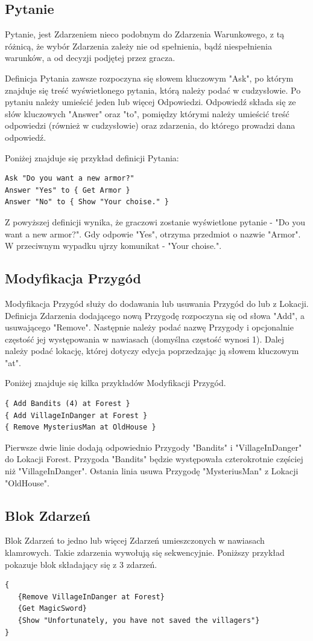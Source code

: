 \documentclass{xmgr}
\begin{document}
\subsection{Pytanie}
Pytanie, jest Zdarzeniem nieco podobnym do Zdarzenia Warunkowego, z tą różnicą, że wybór Zdarzenia zależy nie od spełnienia, bądź niespełnienia warunków, a od decyzji podjętej przez gracza.

Definicja Pytania zawsze rozpoczyna się słowem kluczowym "Ask", po którym znajduje się treść wyświetlonego pytania, którą należy podać w cudzysłowie. Po pytaniu należy umieścić jeden lub więcej Odpowiedzi. Odpowiedź składa się ze słów kluczowych "Answer" oraz "to", pomiędzy którymi należy umieścić treść odpowiedzi (również w cudzysłowie) oraz zdarzenia, do którego prowadzi dana odpowiedź. 

Poniżej znajduje się przykład definicji Pytania:
\begin{lstlisting}
Ask "Do you want a new armor?"
Answer "Yes" to { Get Armor }
Answer "No" to { Show "Your choise." }
\end{lstlisting}

Z powyższej definicji wynika, że graczowi zostanie wyświetlone pytanie - "Do you want a new armor?". Gdy odpowie "Yes", otrzyma przedmiot o nazwie "Armor". W przeciwnym wypadku ujrzy komunikat - "Your choise.".

\subsection{Modyfikacja Przygód}
Modyfikacja Przygód służy do dodawania lub usuwania Przygód do lub z Lokacji. Definicja Zdarzenia dodającego nową Przygodę rozpoczyna się od słowa "Add", a usuwającego "Remove". Następnie należy podać nazwę Przygody i opcjonalnie częstość jej występowania w nawiasach (domyślna częstość wynosi 1). Dalej należy podać lokację, której dotyczy edycja poprzedzając ją słowem kluczowym "at".

Poniżej znajduje się kilka przykładów Modyfikacji Przygód. 
\begin{lstlisting}
{ Add Bandits (4) at Forest }
{ Add VillageInDanger at Forest }
{ Remove MysteriusMan at OldHouse }
\end{lstlisting}
Pierwsze dwie linie dodają odpowiednio Przygody "Bandits" i "VillageInDanger" do Lokacji Forest. Przygoda "Bandits" będzie występowała czterokrotnie częściej niż "VillageInDanger". Ostania linia usuwa Przygodę "MysteriusMan" z Lokacji "OldHouse".

\subsection*{Blok Zdarzeń}
Blok Zdarzeń to jedno lub więcej Zdarzeń umieszczonych w nawiasach klamrowych. Takie zdarzenia wywołują się sekwencyjnie.
Poniższy przykład pokazuje blok składający się z 3 zdarzeń.
\begin{lstlisting}
{
   {Remove VillageInDanger at Forest}
   {Get MagicSword}
   {Show "Unfortunately, you have not saved the villagers"}
}
\end{lstlisting}
\end{document}

